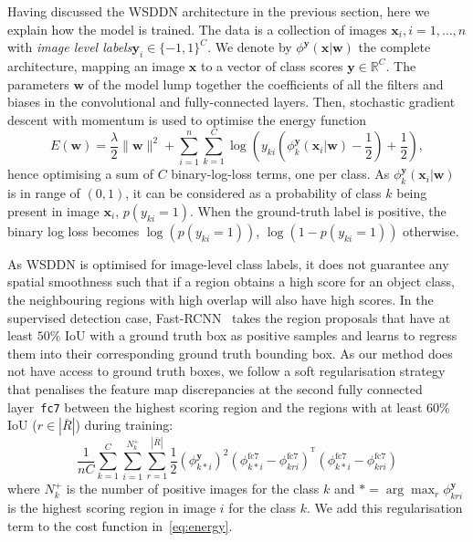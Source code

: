 \documentclass[10pt,twocolumn,letterpaper]{article}
\newcommand{\bx}{\mathbf{x}}
\newcommand{\by}{\mathbf{y}}
\newcommand{\bw}{\mathbf{w}}
\begin{document}

Having discussed the WSDDN architecture in the previous section, here we explain how the model is trained. The data is a collection of images $\bx_i, i=1,\dots, n$ with \emph{image level labels}$\by_i \in \{-1,1\}^C$. We denote by $\phi^{\by}(\bx|\bw)$ the complete architecture, mapping an image $\bx$ to a vector of class scores $\by\in\mathbb{R}^C$. The parameters $\bw$ of the model lump together the coefficients of all the filters and biases in the convolutional and fully-connected layers. Then, stochastic gradient descent with momentum is used to optimise the energy function
\begin{equation}
E(\bw)
=
\frac{\lambda}{2}\|\bw\|^2
+
\sum_{i=1}^n
\sum_{k=1}^C
\log(y_{ki} (\phi^{\by}_k(\bx_i|\bw)-\frac{1}{2}) + \frac{1}{2}),
\label{eq:energy}
\end{equation} hence optimising a sum of $C$ binary-log-loss terms, one per class. As $\phi^{\by}_k(\bx_i|\bw)$ is in range of $(0,1)$, it can be considered as a probability of class $k$ being present in image $\bx_i$, \ie$p(y_{ki}=1)$. When the ground-truth label is positive, the binary log loss becomes $\log(p(y_{ki}=1))$, $\log(1-p(y_{ki}=1))$ otherwise.

As WSDDN is optimised for image-level class labels, it does not guarantee any spatial smoothness such that if a region obtains a high score for an object class, the neighbouring regions with high overlap will also have high scores. In the supervised detection case, Fast-RCNN~\cite{Girshick15} takes the region proposals that have at least $50 \%$ IoU with a ground truth box as positive samples and learns to regress them into their corresponding ground truth bounding box. As our method does not have access to ground truth boxes, we follow a soft regularisation strategy that penalises the feature map discrepancies at the second fully connected layer~\texttt{fc7} between the highest scoring region and the regions with at least $60 \%$ IoU (\ie\;$r\in|\bar{R}|$) during training:
\[
\frac{1}{nC}
\sum_{k=1}^C
\sum_{i=1}^{N_{k}^+}
\sum_{r=1}^{|\bar{R}|}
\frac{1}{2}(\phi^{\by}_{k*i})^2(\phi^{\text{fc7}}_{k*i}-\phi^{\text{fc7}}_{kri})^{^\mathrm{T}}(\phi^{\text{fc7}}_{k*i}-\phi^{\text{fc7}}_{kri})
\] where $N_{k}^+$ is the number of positive images for the class $k$ and $*=\arg\max_r \phi^{\by}_{kri}$ is the highest scoring region in image $i$ for the class $k$. We add this regularisation term to the cost function in~\cref{eq:energy}. 
\end{document}

